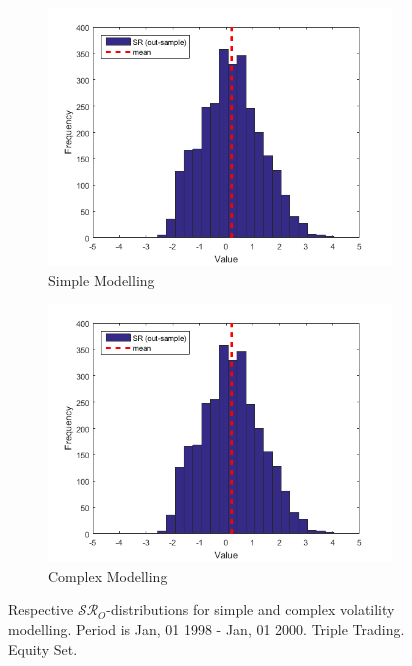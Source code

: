 \documentclass[11pt,a4,twosided,singlespacing,titlepagenumber=on]{scrreprt}
\numberwithin{equation}{chapter} %
\theoremstyle{remark}
\begin{document}
\begin{figure}[H]
    \centering
    \begin{subfigure}[t]{0.49\textwidth}
        \centering
        \includegraphics[width=1\textwidth]{res/params/2923_3653/sr}
        \caption{Simple Modelling}
    \end{subfigure}
    \begin{subfigure}[t]{0.49\textwidth}
        \centering
        \includegraphics[width=1\textwidth]{res/params/2923_3653/sr}
        \caption{Complex Modelling}
    \end{subfigure}
    \caption[]{Respective $\mathcal{SR}_O$-distributions for simple and complex volatility modelling. Period is Jan, 01 1998 - Jan, 01 2000. Triple Trading. Equity Set.}
    \label{fig:sharpe_ratio_comparison}
\end{figure}
\end{document}
